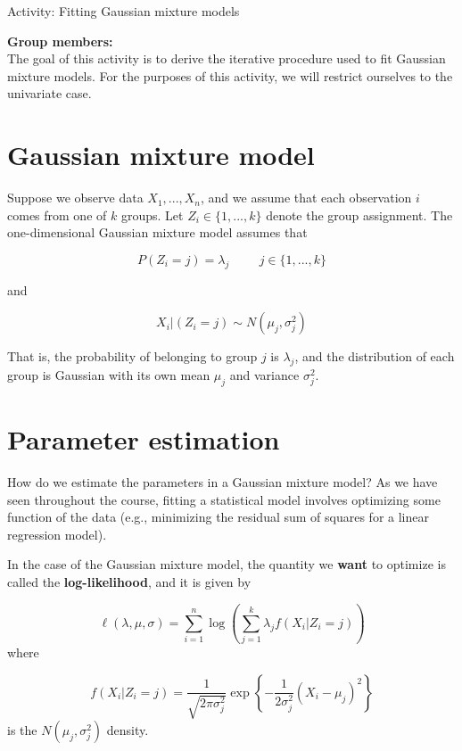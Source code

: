 \documentclass[12pt]{article}
\begin{document}
\begin{center}
\Large
Activity: Fitting Gaussian mixture models \\
\normalsize
\vspace{5mm}
\end{center}

\noindent \textbf{Group members:}\\

The goal of this activity is to derive the iterative procedure used to fit Gaussian mixture models. For the purposes of this activity, we will restrict ourselves to the univariate case.

\section*{Gaussian mixture model}

Suppose we observe data $X_1,...,X_n$, and we assume that each observation $i$ comes from one of $k$ groups. Let $Z_i \in \{1,...,k\}$ denote the group assignment. The one-dimensional Gaussian mixture model assumes that

$$P(Z_i = j) = \lambda_j \hspace{1cm} j \in \{1,...,k\}$$

and

$$X_i | (Z_i = j) \sim N(\mu_j, \sigma_j^2)$$

That is, the probability of belonging to group $j$ is $\lambda_j$, and the distribution of each group is Gaussian with its own mean $\mu_j$ and variance $\sigma_j^2$.

\section*{Parameter estimation}

How do we estimate the parameters in a Gaussian mixture model? As we have seen throughout the course, fitting a statistical model involves optimizing some function of the data (e.g., minimizing the residual sum of squares for a linear regression model).

In the case of the Gaussian mixture model, the quantity we \textbf{want} to optimize is called the \textbf{log-likelihood}, and it is given by

$$\ell(\lambda, \mu, \sigma) = \sum \limits_{i=1}^n \log \left( \sum \limits_{j=1}^k \lambda_j f(X_i | Z_i = j) \right)$$
where

$$f(X_i | Z_i = j) = \frac{1}{\sqrt{2 \pi \sigma_j^2}} \exp \left\lbrace -\frac{1}{2\sigma_j^2} (X_i - \mu_j)^2 \right\rbrace$$
is the $N(\mu_j, \sigma_j^2)$ density.
\end{document}
